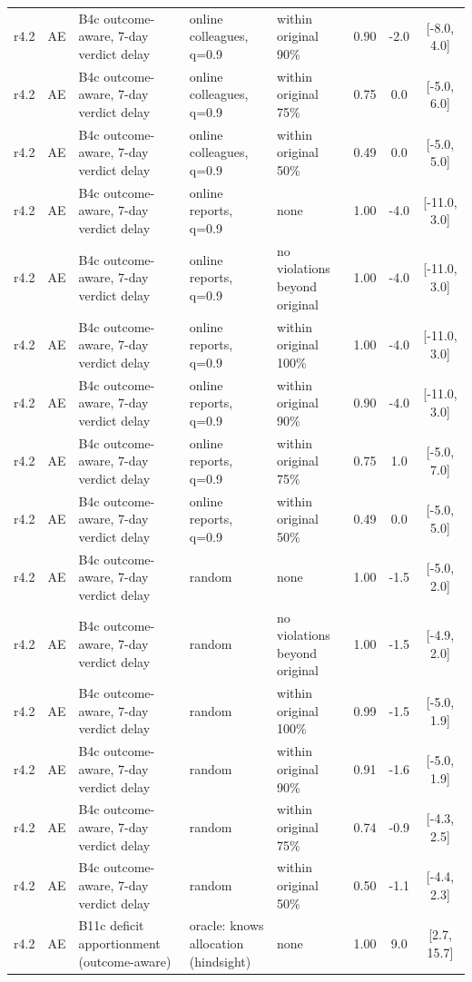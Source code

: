 \documentclass[10pt,onecolumn,letterpaper]{article}
\begin{document}
\begin{longtable}{lllp{4.2cm}p{3.4cm}ccc}
r4.2 & AE & B4c outcome-aware, 7-day verdict delay & online colleagues, q=0.9 & within original 90\% & 0.90 & -2.0 & [-8.0, 4.0] \\
r4.2 & AE & B4c outcome-aware, 7-day verdict delay & online colleagues, q=0.9 & within original 75\% & 0.75 & 0.0 & [-5.0, 6.0] \\
r4.2 & AE & B4c outcome-aware, 7-day verdict delay & online colleagues, q=0.9 & within original 50\% & 0.49 & 0.0 & [-5.0, 5.0] \\
r4.2 & AE & B4c outcome-aware, 7-day verdict delay & online reports, q=0.9 & none & 1.00 & -4.0 & [-11.0, 3.0] \\
r4.2 & AE & B4c outcome-aware, 7-day verdict delay & online reports, q=0.9 & no violations beyond original & 1.00 & -4.0 & [-11.0, 3.0] \\
r4.2 & AE & B4c outcome-aware, 7-day verdict delay & online reports, q=0.9 & within original 100\% & 1.00 & -4.0 & [-11.0, 3.0] \\
r4.2 & AE & B4c outcome-aware, 7-day verdict delay & online reports, q=0.9 & within original 90\% & 0.90 & -4.0 & [-11.0, 3.0] \\
r4.2 & AE & B4c outcome-aware, 7-day verdict delay & online reports, q=0.9 & within original 75\% & 0.75 & 1.0 & [-5.0, 7.0] \\
r4.2 & AE & B4c outcome-aware, 7-day verdict delay & online reports, q=0.9 & within original 50\% & 0.49 & 0.0 & [-5.0, 5.0] \\
r4.2 & AE & B4c outcome-aware, 7-day verdict delay & random & none & 1.00 & -1.5 & [-5.0, 2.0] \\
r4.2 & AE & B4c outcome-aware, 7-day verdict delay & random & no violations beyond original & 1.00 & -1.5 & [-4.9, 2.0] \\
r4.2 & AE & B4c outcome-aware, 7-day verdict delay & random & within original 100\% & 0.99 & -1.5 & [-5.0, 1.9] \\
r4.2 & AE & B4c outcome-aware, 7-day verdict delay & random & within original 90\% & 0.91 & -1.6 & [-5.0, 1.9] \\
r4.2 & AE & B4c outcome-aware, 7-day verdict delay & random & within original 75\% & 0.74 & -0.9 & [-4.3, 2.5] \\
r4.2 & AE & B4c outcome-aware, 7-day verdict delay & random & within original 50\% & 0.50 & -1.1 & [-4.4, 2.3] \\
r4.2 & AE & B11c deficit apportionment (outcome-aware) & oracle: knows allocation (hindsight) & none & 1.00 & 9.0 & [2.7, 15.7] \\

\end{longtable}
\end{document}
